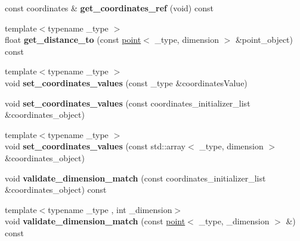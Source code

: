 \begin{DoxyCompactItemize}
\item 
\hypertarget{classxstd_1_1point_aa6910f3a870a3844003ed1fa77dab3b9}{const coordinates \& {\bfseries get\-\_\-coordinates\-\_\-ref} (void) const }\label{classxstd_1_1point_aa6910f3a870a3844003ed1fa77dab3b9}

\item 
\hypertarget{classxstd_1_1point_a1926a1a02d788b584e7e994edb956d61}{{\footnotesize template$<$typename \-\_\-type $>$ }\\float {\bfseries get\-\_\-distance\-\_\-to} (const \hyperlink{classxstd_1_1point}{point}$<$ \-\_\-type, dimension $>$ \&point\-\_\-object) const }\label{classxstd_1_1point_a1926a1a02d788b584e7e994edb956d61}

\item 
\hypertarget{classxstd_1_1point_a468d82213633b70cb8c01f97838e6d49}{{\footnotesize template$<$typename \-\_\-type $>$ }\\void {\bfseries set\-\_\-coordinates\-\_\-values} (const \-\_\-type \&coordinates\-Value)}\label{classxstd_1_1point_a468d82213633b70cb8c01f97838e6d49}

\item 
\hypertarget{classxstd_1_1point_a239dbdfe4d96a38b9eacd76e972897c4}{void {\bfseries set\-\_\-coordinates\-\_\-values} (const coordinates\-\_\-initializer\-\_\-list \&coordinates\-\_\-object)}\label{classxstd_1_1point_a239dbdfe4d96a38b9eacd76e972897c4}

\item 
\hypertarget{classxstd_1_1point_a16ea81630c6918bca7393e7ce46e1691}{{\footnotesize template$<$typename \-\_\-type $>$ }\\void {\bfseries set\-\_\-coordinates\-\_\-values} (const std\-::array$<$ \-\_\-type, dimension $>$ \&coordinates\-\_\-object)}\label{classxstd_1_1point_a16ea81630c6918bca7393e7ce46e1691}

\item 
\hypertarget{classxstd_1_1point_a5e32aa4388cfc0d9b9b3df56c5d8bd91}{void {\bfseries validate\-\_\-dimension\-\_\-match} (const coordinates\-\_\-initializer\-\_\-list \&coordinates\-\_\-object) const }\label{classxstd_1_1point_a5e32aa4388cfc0d9b9b3df56c5d8bd91}

\item 
\hypertarget{classxstd_1_1point_a15edf9d511dcd8d27c98e77b18033573}{{\footnotesize template$<$typename \-\_\-type , int \-\_\-dimension$>$ }\\void {\bfseries validate\-\_\-dimension\-\_\-match} (const \hyperlink{classxstd_1_1point}{point}$<$ \-\_\-type, \-\_\-dimension $>$ \&) const }\label{classxstd_1_1point_a15edf9d511dcd8d27c98e77b18033573}


\end{DoxyCompactItemize}
